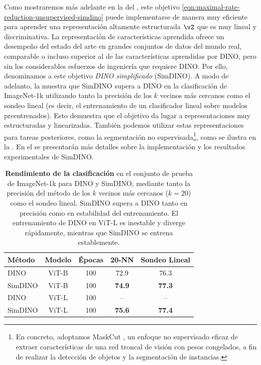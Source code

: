 \documentclass[../../book-main.tex]{subfiles}
\begin{document}
Como mostraremos más adelante en la
 del
, este objetivo
\eqref{eqn:maximal-rate-reduction-unsupervised-simdino} puede
implementarse de manera muy eficiente para aprender una representación
altamente estructurada $\vZ$ que es muy lineal y discriminativa.
La representación de características aprendida ofrece un desempeño del estado del arte 
en grandes conjuntos de datos del mundo real, comparable o incluso superior
al de las características aprendidas por DINO, pero sin los considerables esfuerzos de ingeniería
que requiere DINO. Por ello, denominamos a este objetivo {\em
DINO simplificado} (SimDINO). A modo de adelanto, la
 muestra que SimDINO
supera a DINO en la clasificación de ImageNet-1k utilizando tanto
la precisión de los \(k\) vecinos más cercanos como el sondeo lineal (es decir, el entrenamiento de un
clasificador lineal sobre modelos preentrenados). Esto demuestra que el
objetivo da lugar a representaciones muy estructuradas y linearizadas.
También podemos utilizar estas representaciones para tareas posteriores, como
la segmentación no supervisada\footnote{En concreto, adoptamos MaskCut
    \cite{wang2023cut}, un enfoque no supervisado eficaz de extraer
    características de una red troncal de visión con pesos congelados, a fin de realizar la detección de objetos y
la segmentación de instancias.}, como se ilustra en la
. En el
	 se presentarán más detalles sobre la implementación y
	los resultados experimentales de SimDINO.

	\begin{table}
	    \centering
	    \begin{tabular}{@{}lcccc@{}} %
		\toprule
		Método & Modelo & Épocas & 20-NN & Sondeo Lineal
		\\
		\midrule
		DINO & ViT-B & 100 & 72.9 & 76.3 \\
		SimDINO & ViT-B & 100 & \bf 74.9 & \bf 77.3 \\
		DINO & ViT-L & 100 & -- & -- \\
		SimDINO & ViT-L & 100 & \bf 75.6 & \bf 77.4 \\

		\bottomrule
	    \end{tabular}\smallskip
	    \caption{\small\textbf{Rendimiento de la clasificación} en el conjunto de prueba de ImageNet-1k
		para DINO y SimDINO, mediante tanto la precisión del método de los \(k\) vecinos más cercanos
		(\(k = 20\)) como el sondeo lineal. SimDINO
		supera a DINO tanto
		en precisión como en estabilidad del entrenamiento. El entrenamiento de DINO en ViT-L es
	    inestable y diverge rápidamente, mientras que SimDINO se entrena establemente.}
	    \label{tab:dino_imagenet_linear_probing_teaser}
	\end{table}
\end{document}
